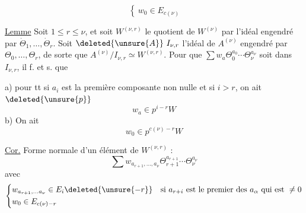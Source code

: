 \[
\left\{\ w_0\in E_{c(\nu)}\right.
\]

\uline{Lemme} Soit $1\leq r\leq\nu$, et soit $W^{(\nu,r)}$ le quotient de $W^{(\nu)}$ par l'idéal engendré par $\dot{\Theta}_1,\ldots,\dot{\Theta}_r$.  Soit $\deleted{\unsure{A}}\ I_{\nu,r}$ l'idéal de $A^{(\nu)}$ engendré par $\Theta_0,\ldots,\Theta_r$, de sorte que $A^{(\nu)}/I_{\nu,r}\simeq W^{(\nu,r)}$. Pour que $\sum w_a\Theta_0^{a_0}\cdots\Theta_\nu^{a_\nu}$ soit dans $I_{\nu,r}$, il f. et s. que

a) pour tt    si $a_i$ est la première composante non nulle et si $i>r$, on ait $\deleted{\unsure{p}}$
\[
w_a\in p^{i-r}W
\]
b) On ait
\[
w_0\in p^{c(\nu)-r}W
\]

\uline{Cor.} Forme normale d'un élément de $W^{(\nu,r)}$ :
\[
\sum w_{a_{r+1},\ldots,a_\nu}\Theta_{r+1}^{a_{r+1}}\cdots\Theta_\nu^{a_\nu}
\]
avec
\[
\left\{\begin{aligned}
&w_{a_{r+1},\ldots a_\nu}\in E_i\deleted{\unsure{-r}}\quad\text{si }a_{r+i}\text{ est le premier des }a_\alpha\text{ qui est }\ne0\\
&w_0\in E_{c(\nu)-r}
\end{aligned}\right.
\]
